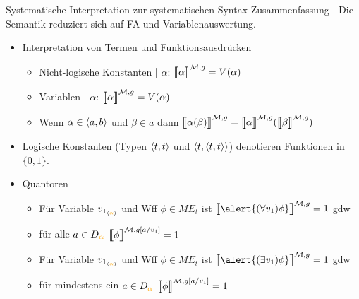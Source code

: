 \begin{frame}
  {Systematische Interpretation zur systematischen Syntax}
  \onslide<+->
  \onslide<+->
  Zusammenfassung | Die Semantik reduziert sich auf FA und Variablenauswertung.\\
  \Halbzeile
  \begin{itemize}[<+->]
    \item Interpretation von Termen und Funktionsausdrücken
      \begin{itemize}[<+->]
        \item Nicht-logische Konstanten | \alert{$\alpha$: $\DEM{\alpha}=V(\alpha)$}
        \item Variablen | \alert{$\alpha$: $\DEM{\alpha}=V(\alpha)$}
        \item Wenn $\alpha\in{\langle{}a,b\rangle}$ und $\beta\in{}a$ dann $\DEM{\alpha(\beta)}=\DEM{\alpha}(\DEM{\beta})$
      \end{itemize}
      \Halbzeile
    \item Logische Konstanten (Typen ${\langle{}t,t\rangle}$ und ${\langle{}t,{\langle{}t,t\rangle}\rangle}$) denotieren Funktionen in $\{0,1\}$.
      \Halbzeile
    \item Quantoren
      \begin{itemize}[<+->]
        \item Für Variable $v_{1_{\ram{\orongsch{\alpha}}}}$ und Wff $\phi\in{}ME_t$ ist $\DEM{\alert{(\forall{}v_1)\phi}}=1$ gdw
        \item[ ] für alle $a\in{}D_{\orongsch{\alpha}}$ $\Dem{\phi}{\mMm,g[a/v_1]}=1$
       \Viertelzeile 
     \item Für Variable $v_{1_{\ram{\orongsch{\alpha}}}}$ und Wff $\phi\in{}ME_t$ ist $\DEM{\alert{(\exists{}v_1)\phi}}=1$ gdw
        \item[ ] für mindestens ein $a\in{}D_{\orongsch{\alpha}}$ $\Dem{\phi}{\mMm,g[a/v_1]}=1$
      \end{itemize}
  \end{itemize}
\end{frame}

